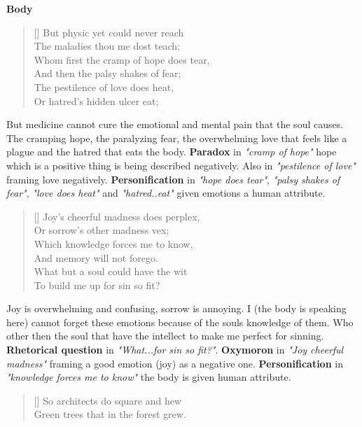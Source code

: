 \documentclass[12pt, a4paper]{article}
\begin{document}
\centerline{\textbf{\large{Body}}}
\begin{verse}[\versewidth]
{\fontverse
But physic yet could never reach\\
The maladies thou me dost teach;\\
Whom first the cramp of hope does tear,\\
And then the palsy shakes of fear;\\
The pestilence of love does heat,\\
Or hatred’s hidden ulcer eat; 
} 
\end{verse}

But medicine cannot cure the emotional and mental pain that the soul
causes. The cramping hope, the paralyzing fear, the overwhelming love
that feels like a plague and the hatred that eats
the body. \textbf{Paradox} in \textit{"cramp of hope"} hope which is a positive
thing is being described negatively. Also in \textit{"pestilence of love"} 
framing love negatively. \textbf{Personification} in
\textit{"hope does tear"}, \textit{"palsy shakes of fear"}, \textit{"love does heat"} and 
\textit{"hatred..eat"} given emotions a human attribute. 

\begin{verse}[\versewidth]
{\fontverse
Joy’s cheerful madness does perplex,\\
Or sorrow’s other madness vex;\\
Which knowledge forces me to know,\\
And memory will not forego.\\
What but a soul could have the wit\\
To build me up for sin so fit? 
} 
\end{verse}

Joy is overwhelming and confusing, sorrow is annoying. I 
(the body is speaking here) cannot forget these emotions because 
of the souls knowledge of them. Who other then the soul that have 
the intellect to make me perfect for sinning. \textbf{Rhetorical question}
in \textit{"What...for sin so fit?"}. \textbf{Oxymoron} in \textit{"Joy cheerful madness"}
framing a good emotion (joy) as a negative one. \textbf{Personification}
in \textit{"knowledge forces me to know"} the body is given human attribute.


\begin{verse}[\versewidth]
{\fontverse
So architects do square and hew\\
Green trees that in the forest grew.
} 
\end{verse}
\end{document}
